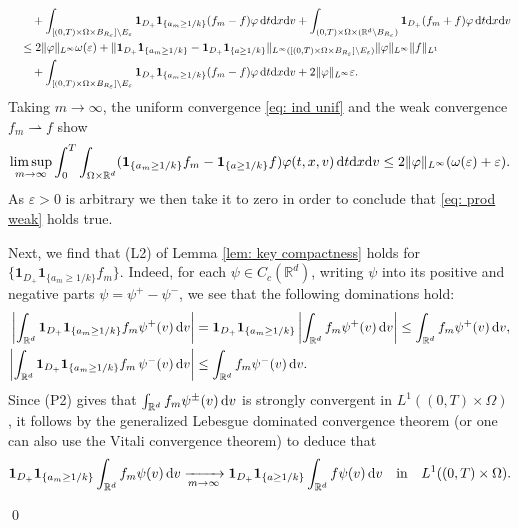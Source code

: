 \documentclass[10pt, reqno]{amsart}
\theoremstyle{plain}
\theoremstyle{definition}
\theoremstyle{remark}
\renewenvironment{proof}[1][\proofname]{\noindent{\scshape #1.\quad}}{\qed}
\numberwithin{equation}{section}
\newcommand{\R}{\mathbb{R}}
\newcommand{\ve}{\varepsilon}
\newcommand{\dx}{\textnormal{d}x}
\newcommand{\dv}{\textnormal{d}v}
\newcommand{\dt}{\textnormal{d}t}
\newcommand{\weakto}{\rightharpoonup}
\newcommand{\inttr}{\int_{\Omega\times\R^d}}
\newcommand{\intr}{\int_{\R^d}}
\begin{document}
\begin{proof}[Proof of Proposition \ref{prop: weighted fisher}]
\begin{align*}
        &\qquad + \int_{[(0,T)\times\Omega\times B_{R_\ve}]\setminus E_\ve} \mathbf{1}_{D_+} \mathbf{1}_{\{a_m\ge 1/k \} } (f_m - f) \varphi \,\dt\dx\dv  + \int_{(0,T)\times\Omega\times (\R^d\setminus B_{R_\ve}) } \mathbf{1}_{D_+} (f_m + f) \varphi \,\dt\dx\dv \\
        &\quad\le 2\|\varphi\|_{L^\infty} \omega(\ve) + \|\mathbf{1}_{D_+}\mathbf{1}_{\{a_m\ge 1/k\}} - \mathbf{1}_{D_+} \mathbf{1}_{\{a\ge 1/k\}}\|_{L^\infty([(0,T)\times\Omega\times B_{R_\ve}]\setminus E_\ve )} \|\varphi\|_{L^\infty} \|f\|_{L^1} \\
        &\qquad + \int_{[(0,T)\times\Omega\times B_{R_\ve}]\setminus E_\ve} \mathbf{1}_{D_+} \mathbf{1}_{\{a_m\ge 1/k \} } (f_m - f) \varphi \,\dt\dx\dv + 2\|\varphi\|_{L^\infty} \ve.
    \end{align*}
    Taking $m\to\infty$, the uniform convergence \eqref{eq: ind unif} and the weak convergence $f_m\weakto f$ show
    \begin{align*}
        \limsup_{m\to\infty} \int_0^T \inttr (\mathbf{1}_{\{a_m\ge 1/k\}} f_m - \mathbf{1}_{\{a \ge 1/k \} } f ) \varphi(t,x,v) \,\dt\dx\dv \le 2\|\varphi\|_{L^\infty} (\omega(\ve) + \ve).
    \end{align*}
    As $\ve>0$ is arbitrary we then take it to zero in order to conclude that \eqref{eq: prod weak} holds true.

    Next, we find that (L2) of Lemma \ref{lem: key compactness} holds for $\{\mathbf{1}_{D_+} \mathbf{1}_{\{a_m\ge 1/k\}} f_m\}$. Indeed, for each $\psi \in C_c(\R^d)$, writing $\psi$ into its positive and negative parts $\psi = \psi^+ - \psi^-$, we see that the following dominations hold:
    \begin{align*}
        \left|\intr \mathbf{1}_{D_+} \mathbf{1}_{\{a_m\ge 1/k\}}  f_m \psi^+(v)\,\dv \right| &= \mathbf{1}_{D_+} \mathbf{1}_{\{a_m\ge 1/k\}} \left|\intr f_m \psi^+(v)\,\dv\right| \le \intr f_m \psi^+(v) \,\dv ,\\
        \left|\intr \mathbf{1}_{D_+} \mathbf{1}_{\{a_m\ge 1/k\}} f_m \, \psi^-(v)\,\dv \right| &\le \intr f_m \psi^-(v)\,\dv.
    \end{align*}
    Since (P2) gives that $\intr f_m\psi^{\pm}(v)\,\dv$ is strongly convergent in $L^1((0,T)\times\Omega)$, it follows by the generalized Lebesgue dominated convergence theorem (or one can also use the Vitali convergence theorem) to deduce that
    \begin{align*}
        \mathbf{1}_{D_+} \mathbf{1}_{\{a_m\ge 1/k\}} \intr f_m \psi(v)\,\dv \xrightarrow[m\to\infty]{} \mathbf{1}_{D_+} \mathbf{1}_{\{a\ge 1/k\}} \intr f \psi(v) \,\dv \quad \text{in} \quad L^1((0,T)\times\Omega).
    \end{align*}


\end{proof}
\end{document}
